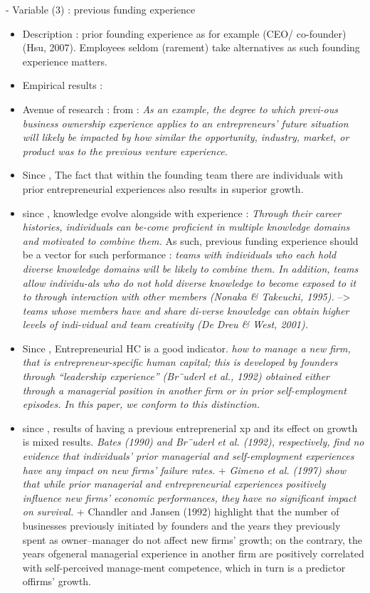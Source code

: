 \begin{itemize}
\begin{itemize}
\begin{itemize}
\end{itemize}

- Variable (3) : previous funding experience
\begin{itemize}
  \item Description : prior founding experience as for example (CEO/ co-founder) (Hsu, 2007). Employees seldom (rarement) take alternatives as such founding experience matters.
  \item Empirical results :
  \item Avenue of research : from \citep{marvel2016human} : \textit{As an example, the degree to which previ-ous business ownership experience applies to an entrepreneurs’ future situation will likely be impacted by how similar the opportunity, industry, market, or product was to the previous venture experience.}
  \item Since \citet{colombo2005founders}, The fact that within the founding team there are individuals with prior entrepreneurial experiences also results in superior growth.
  \item since \citet{taylor2006superman}, knowledge evolve alongside with experience : \textit{Through their career histories, individuals can be-come proficient in multiple knowledge domains and motivated to combine them.} As such, previous funding experience should be a vector for such performance : \textit{teams with individuals who each hold diverse knowledge domains will be likely to combine them. In addition, teams allow individu-als who do not hold diverse knowledge to become exposed to it to through interaction with other members (Nonaka & Takeuchi, 1995).} --> \textit{teams whose members have and share di-verse knowledge can obtain higher levels of indi-vidual and team creativity (De Dreu & West, 2001).}
  \item Since \citet{colombo2005founders}, Entrepreneurial HC is a good indicator. \textit{how to manage a new firm, that is entrepreneur-specific human capital; this is developed by founders through “leadership experience” (Br¨uderl et al., 1992) obtained either through a managerial position in another firm or in prior self-employment episodes. In this paper, we conform to this distinction.}
  \item since \citet{colombo2005founders}, results of having a previous entreprenerial xp and its effect on growth is mixed results. \textit{Bates (1990) and Br¨uderl et al. (1992), respectively, find no evidence that individuals’ prior managerial and self-employment experiences have any impact on new firms’ failure rates.} + \textit{Gimeno et al. (1997) show that while prior managerial and entrepreneurial experiences positively influence new firms’ economic performances, they have no significant impact on survival.} + Chandler and Jansen (1992) highlight that the number of businesses previously initiated by founders and the years they previously spent as owner–manager do not affect new firms’ growth; on the contrary, the years ofgeneral managerial experience in another firm are positively correlated with self-perceived manage-ment competence, which in turn is a predictor offirms’ growth.

\end{itemize}
\end{itemize}
\end{itemize}
